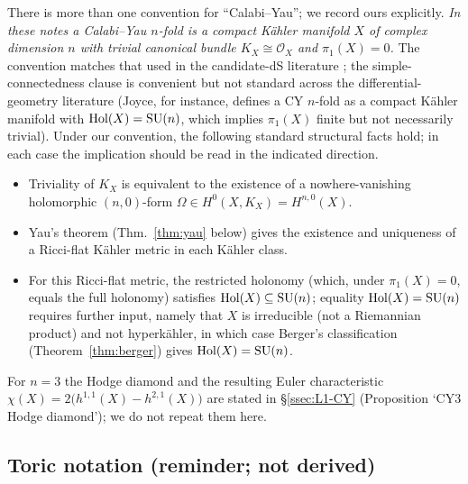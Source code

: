 There is more than one convention for ``Calabi--Yau''; we record
ours explicitly. \emph{In these notes a Calabi--Yau $n$-fold is a
compact K\"ahler manifold $X$ of complex dimension $n$ with
trivial canonical bundle $K_X \cong \mathcal{O}_X$ and
$\pi_1(X) = 0$.} The convention matches that used in the
candidate-dS literature
\cite{McAllister:2025qwq,McAllister:2024lnt}; the
simple-connectedness clause is convenient but not standard across
the differential-geometry literature (Joyce, for instance, defines a
CY $n$-fold as a compact K\"ahler manifold with $\mathrm{Hol}(X) =
\mathrm{SU}(n)$, which implies $\pi_1(X)$ finite but not necessarily
trivial). Under our convention, the following standard structural
facts hold; in each case the implication should be read in the
indicated direction.
\begin{itemize}[nosep,leftmargin=*]
    \item Triviality of $K_X$ is equivalent to the existence of a
    nowhere-vanishing holomorphic $(n,0)$-form
    $\Omega \in H^0(X, K_X) = H^{n,0}(X)$.
    \item Yau's theorem (Thm.~\ref{thm:yau} below) gives the
    existence and uniqueness of a Ricci-flat K\"ahler metric in
    each K\"ahler class.
    \item For this Ricci-flat metric, the restricted holonomy
    (which, under $\pi_1(X)=0$, equals the full holonomy) satisfies
    $\mathrm{Hol}(X) \subseteq \mathrm{SU}(n)$; equality $\mathrm{Hol}(X) =
    \mathrm{SU}(n)$ requires further input, namely that $X$ is
    irreducible (not a Riemannian product) and not hyperk\"ahler,
    in which case Berger's classification
    (Theorem~\ref{thm:berger}) gives $\mathrm{Hol}(X) = \mathrm{SU}(n)$.
\end{itemize}
For $n=3$ the Hodge diamond and the resulting Euler characteristic $\chi(X) = 2\bigl(h^{1,1}(X) - h^{2,1}(X)\bigr)$ are stated in \S\ref{ssec:L1-CY} (Proposition `CY3 Hodge diamond'); we do not repeat them here.

\subsection{Toric notation (reminder; not derived)}


